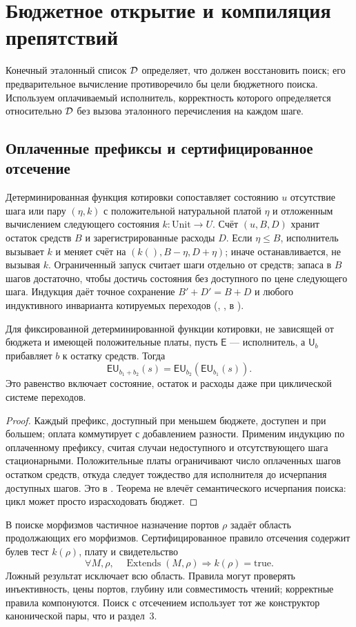 \section{Бюджетное открытие и компиляция препятствий}\label{sec:obstruction}
Конечный эталонный список $\mathcal D$ определяет, что должен восстановить поиск; его предварительное вычисление противоречило бы цели бюджетного поиска. Используем оплачиваемый исполнитель, корректность которого определяется относительно $\mathcal D$ без вызова эталонного перечисления на каждом шаге.

\subsection{Оплаченные префиксы и сертифицированное отсечение}
Детерминированная функция котировки сопоставляет состоянию $u$ отсутствие шага или пару $(\eta, k)$ с положительной натуральной платой $\eta$ и отложенным вычислением следующего состояния $k:\mathrm{Unit}\to U$. Счёт $(u,B,D)$ хранит остаток средств $B$ и зарегистрированные расходы $D$. Если $\eta\le B$, исполнитель вызывает $k$ и меняет счёт на $(k(),B-\eta,D+\eta)$; иначе останавливается, не вызывая $k$. Ограниченный запуск считает шаги отдельно от средств; запаса в $B$ шагов достаточно, чтобы достичь состояния без доступного по цене следующего шага. Индукция даёт точное сохранение $B'+D'=B+D$ и любого индуктивного инварианта котируемых переходов (, ,  в ).

\begin{theorem}\label{thm:resume}
Для фиксированной детерминированной функции котировки, не зависящей от бюджета и имеющей положительные платы, пусть $\mathsf E$ --- исполнитель, а $\mathsf U_b$ прибавляет $b$ к остатку средств. Тогда
\[
 \mathsf E\mathsf U_{b_1+b_2}(s)=\mathsf E\mathsf U_{b_2}(\mathsf E\mathsf U_{b_1}(s)).
\]
Это равенство включает состояние, остаток и расходы даже при циклической системе переходов.
\end{theorem}
\begin{proof}
Каждый префикс, доступный при меньшем бюджете, доступен и при большем; оплата коммутирует с добавлением разности. Применим индукцию по оплаченному префиксу, считая случаи недоступного и отсутствующего шага стационарными. Положительные платы ограничивают число оплаченных шагов остатком средств, откуда следует тождество для исполнителя до исчерпания доступных шагов. Это  в . Теорема не влечёт семантического исчерпания поиска: цикл может просто израсходовать бюджет.
\end{proof}
В поиске морфизмов частичное назначение портов $\rho$ задаёт область продолжающих его морфизмов. Сертифицированное правило отсечения содержит булев тест $k(\rho)$, плату и свидетельство
\[
 \forall M,\rho,\quad \operatorname{Extends}(M,\rho)\Longrightarrow k(\rho)=\mathrm{true}.
\]
Ложный результат исключает всю область. Правила могут проверять инъективность, цены портов, глубину или совместимость чтений; корректные правила компонуются. Поиск с отсечением использует тот же конструктор канонической пары, что и раздел~3.

